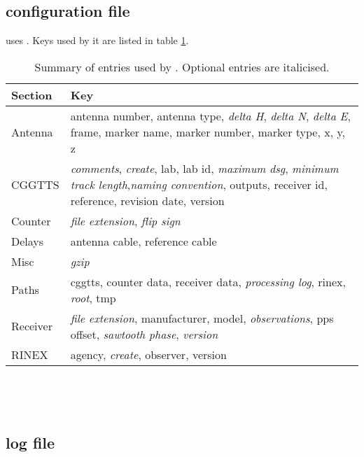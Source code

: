 \subsection{configuration file}

 uses .
Keys used by it are listed in table \ref{t:gpscvKeys}.

\begin{table}
\begin{tabular}{l|p{10cm}}
Section & Key \\ \hline
Antenna & antenna number, antenna type, \textit{delta H}, \textit{delta N},
         \textit{delta E}, frame, marker name, marker number, marker type, 
         x, y, z \\ \hline
CGGTTS  & \textit{comments}, \textit{create}, lab, lab id, 
         \textit{maximum dsg}, \textit{minimum track length},\textit{naming convention},
         outputs, receiver id, reference, revision date, version\\
Counter & \textit{file extension}, \textit{flip sign}\\ \hline
Delays  &  antenna cable, reference cable\\
Misc & \textit{gzip}\\
Paths & cggtts, counter data, receiver data, \textit{processing log},
        rinex, \textit{root}, tmp\\
Receiver & \textit{file extension}, manufacturer, model,
          \textit{observations}, pps offset, \textit{sawtooth phase},
          \textit{version}\\ \hline
RINEX & agency, \textit{create}, observer, version\\
\end{tabular}
\caption{Summary of  entries used by . Optional entries are italicised. \label{t:gpscvKeys}}
\end{table}

\begin{lstlisting}




\end{lstlisting}

\subsection{log file}